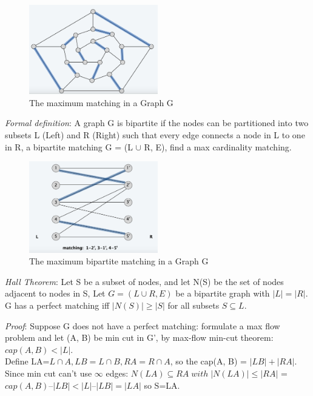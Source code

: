 \documentclass[11pt]{article}
\begin{document}
\begin{figure}[H]
		\centering
		\includegraphics[width=0.5\textwidth ]{matching}
		\caption{The maximum matching in a Graph G}
\end{figure}

\emph{Formal definition}: A graph G is bipartite if the nodes can be partitioned into two subsets L (Left) and R (Right) such that every edge connects a node in L to one in R, a bipartite matching G = (L $\cup$ R, E), find a max cardinality matching.

\begin{figure}[H]
		\centering
		\includegraphics[width=0.5\textwidth ]{bmatching}
		\caption{The maximum bipartite matching in a Graph G}
\end{figure}


\emph{Hall Theorem}: Let S be a subset of nodes, and let N(S) be the set of nodes adjacent to nodes in S, Let $G = (L \cup R, E)$ be a bipartite graph with $|L| = |R|$. G has a perfect matching iff $|N(S)| \geq |S|$ for all subsets $S \subseteq L$.\\

\clearpage

\emph{Proof}: Suppose G does not have a perfect matching: formulate a max flow problem and let (A, B) be min cut in G', by max-flow min-cut theorem: $cap(A, B) < | L |$.\\
Define LA=$L\cap A, LB=L \cap B, RA=R \cap A$, so the cap(A, B) = $| LB | + | RA |$. Since min cut can't use $\infty$ edges: $N(LA) \subseteq RA \; with \; |N(LA)| \leq |RA|$ = $cap(A,B) – |LB| < |L| – |LB| = |LA|$ so S=LA.
\end{document}
